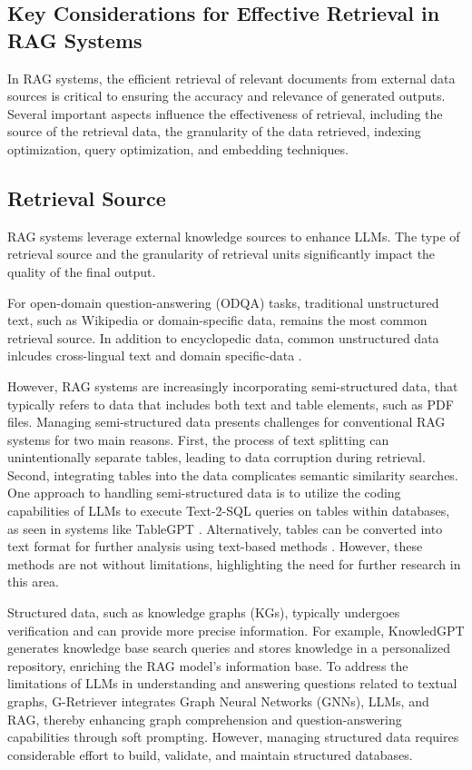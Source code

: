 \subsection{Key Considerations for Effective Retrieval in RAG Systems}

In RAG systems, the efficient retrieval of relevant documents from external data sources is critical to ensuring the accuracy and relevance of generated outputs. Several important aspects influence the effectiveness of retrieval, including the source of the retrieval data, the granularity of the data retrieved, indexing optimization, query optimization, and embedding techniques.

\subsection{Retrieval Source}

RAG systems leverage external knowledge sources to enhance LLMs. The type of retrieval source and the granularity of retrieval units significantly impact the quality of the final output.

For open-domain question-answering (ODQA) tasks, traditional unstructured text, such as Wikipedia or domain-specific data, remains the most common retrieval source. In addition to encyclopedic data, common unstructured data inlcudes cross-lingual text and domain specific-data \cite{li2023classification}.

However, RAG systems are increasingly incorporating semi-structured data, that typically refers to data that includes both text and table elements, such as PDF files. Managing semi-structured data presents challenges for conventional RAG systems for two main reasons. First, the process of text splitting can unintentionally separate tables, leading to data corruption during retrieval. Second, integrating tables into the data complicates semantic similarity searches. One approach to handling semi-structured data is to utilize the coding capabilities of LLMs to execute Text-2-SQL queries on tables within databases, as seen in systems like TableGPT \cite{zha2023tablegpt}. Alternatively, tables can be converted into text format for further analysis using text-based methods \cite{luo2023augmented}. However, these methods are not without limitations, highlighting the need for further research in this area.

Structured data, such as knowledge graphs (KGs), typically undergoes verification and can provide more precise information. For example, KnowledGPT \cite{wang2023knowledgpt} generates knowledge base search queries and stores knowledge in a personalized repository, enriching the RAG model’s information base. To address the limitations of LLMs in understanding and answering questions related to textual graphs, G-Retriever \cite{he2024g} integrates Graph Neural Networks (GNNs), LLMs, and RAG, thereby enhancing graph comprehension and question-answering capabilities through soft prompting. However, managing structured data requires considerable effort to build, validate, and maintain structured databases.

